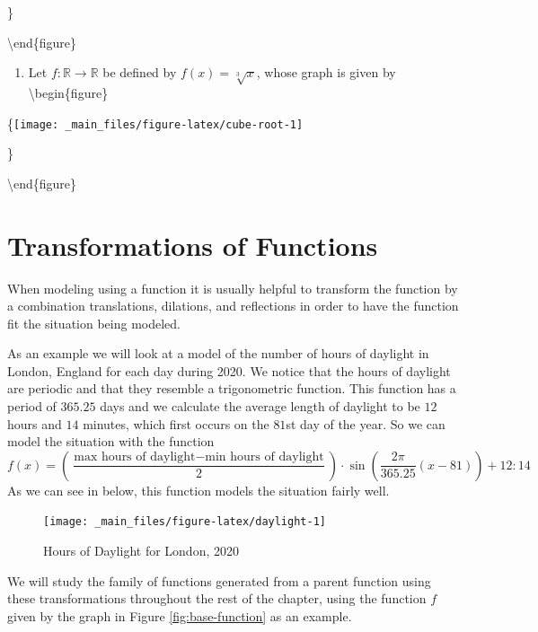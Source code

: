 \documentclass[
]{book}
\providecommand{\tightlist}{%
  \setlength{\itemsep}{0pt}\setlength{\parskip}{0pt}}
\theoremstyle{definition}
\theoremstyle{definition}
\theoremstyle{definition}
\theoremstyle{definition}
\theoremstyle{remark}
\begin{document}
\begin{enumerate}
  \}

  \textbackslash end\{figure\}

  \begin{enumerate}
  \def\labelenumii{\alph{enumii}.}
  \tightlist
  \item
    Let \(f:\mathbb{R} \rightarrow \mathbb{R}\) be defined by \(f(x)=\sqrt[3]{x}\), whose graph is given by
    \textbackslash begin\{figure\}
  \end{enumerate}

  \{\centering \texttt{[image: \_main\_files/figure-latex/cube-root-1]}

  \}

  \textbackslash end\{figure\}
\end{enumerate}

\hypertarget{transformations-of-functions}{%
\section{Transformations of Functions}\label{transformations-of-functions}}

When modeling using a function it is usually helpful to transform the function by a combination translations, dilations, and reflections in order to have the function fit the situation being modeled.

As an example we will look at a model of the number of hours of daylight in London, England for each day during 2020. We notice that the hours of daylight are periodic and that they resemble a trigonometric function. This function has a period of \(365.25\) days and we calculate the average length of daylight to be \(12\) hours and \(14\) minutes, which first occurs on the \(81\)st day of the year. So we can model the situation with the function \[f(x)= \left( \frac{\mbox{max hours of daylight} - \mbox{min hours of daylight}}{2}\right) \cdot \sin \left(\frac{2\pi}{365.25} \left(x-81\right)\right) + 12:14\]
As we can see in below, this function models the situation fairly well.

\begin{figure}

{\centering \texttt{[image: \_main\_files/figure-latex/daylight-1]} 

}

\caption{Hours of Daylight for London, 2020}\label{fig:daylight}
\end{figure}

We will study the family of functions generated from a parent function using these transformations throughout the rest of the chapter, using the function \(f\) given by the graph in Figure \ref{fig:base-function} as an example.
\end{document}
